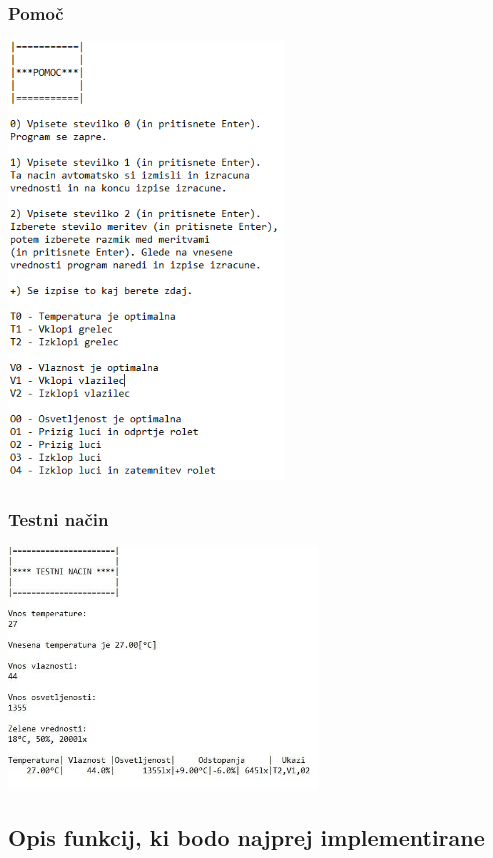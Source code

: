 \documentclass[a4paper,12pt]{article}
\begin{document}
			\subsubsection{Pomoč}

				\includegraphics[width=7.3cm]{diagrami_slike/pomoc.png}

			\subsubsection{Testni način}
		
				\includegraphics[width=8.2cm]{diagrami_slike/testni_nacin.jpg}

		\subsection{Opis funkcij, ki bodo najprej implementirane}
\end{document}
